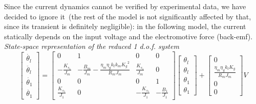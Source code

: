Since the current dynamics cannot be verified by experimental data, we have decided to ignore it~(the rest of the model is not significantly affected by that, since its transient is definitely negligible): in the following model, the current statically depends on the input voltage and the electromotive force (back-emf).
\textit{State-space representation of the reduced 1 d.o.f. system}
\begin{equation}
	\begin{bmatrix}
		\dot{\theta_l} \\
		\ddot{\theta_l} \\
		\dot{\theta_1} \\
		\ddot{\theta_1}
	\end{bmatrix}
	=
	\begin{bmatrix}
		0 &1 & 0 & 0 \\
		-\frac{K_{s_1}}{J_m} & -\frac{B_m}{J_m}-\frac{\eta_m \eta_g k_t k_m {K_g}^2}{R_m J_m}  & \frac{K_{s_1}}{J_m} & 0 \\
		0 & 0 & 0 & 1 \\
		\frac{K_{s_1}}{J_1} & 0 & -\frac{K_{s_1}}{J_1} & -\frac{B_1}{J_1}
	\end{bmatrix}
	\begin{bmatrix}
		\theta_l \\
		\theta_l \\
		\theta_1 \\
		\theta_1
	\end{bmatrix}
	+
	\begin{bmatrix}
		0 \\
		\frac{\eta_m \eta_g k_t K_g}{R_m J_m} \\
		0 \\
		0
	\end{bmatrix}
	V
\end{equation}

